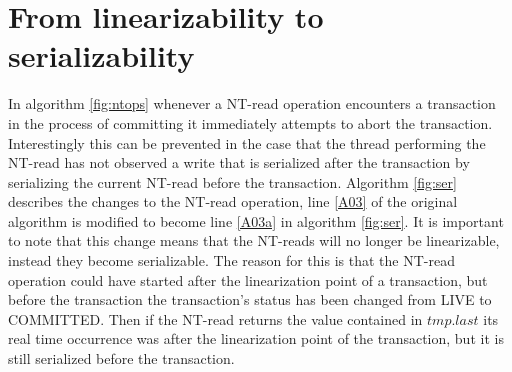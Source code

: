 \begin{figure} [htb]
\end{figure}





\section{From linearizability to serializability}

In algorithm \ref{fig:ntops} whenever a NT-read operation encounters
a transaction in the process of committing it immediately attempts to abort the transaction.
Interestingly this can be prevented
in the case that the thread performing the NT-read has not observed a write that is serialized after the transaction
by serializing the current NT-read before the transaction.
Algorithm \ref{fig:ser} describes the changes to the NT-read operation, line \ref{A03} of
the original algorithm is modified to become line \ref{A03a} in algorithm \ref{fig:ser}.
It is important to note that this change means that the NT-reads will no longer be linearizable,
instead they become serializable.
The reason for this is that the NT-read operation could have started after the linearization point
of a transaction, but before the transaction the transaction's status has been changed from LIVE to
COMMITTED.
Then if the NT-read returns the value contained in $\mathit{tmp.last}$ its real time occurrence was
after the linearization point of the transaction, but it is still serialized before the transaction.











